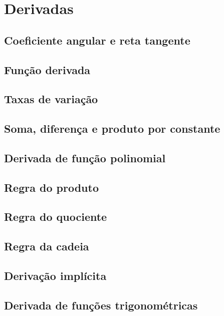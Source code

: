 
\chapter{Derivadas}\label{chap:derivadas}

\emconstrucao


\section{Coeficiente angular e reta tangente}\label{sec:derivadas_coef_angular}

\section{Função derivada}

\section{Taxas de variação}

\section{Soma, diferença e produto por constante}
\section{Derivada de função polinomial}
\section{Regra do produto}
\section{Regra do quociente}
\section{Regra da cadeia}
\section{Derivação implícita}
\section{Derivada de funções trigonométricas}
